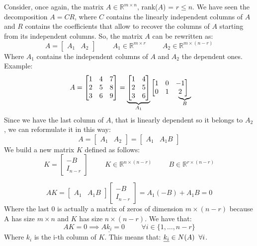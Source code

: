Consider, once again, the matrix $A \in \mathbb{R}^{m\times n}$, rank($A$) = $r \leq n$. 
We have seen the decomposition $A = CR$, where $C$ contains the linearly independent columns of $A$ and $R$ contains the coefficients that allow to recover the columns of $A$ starting from its independent columns. 
So, the matrix $A$ can be rewritten as:
\[
  A = \begin{bmatrix}
    A_1 & A_2
  \end{bmatrix} 
  \hspace{1cm}
  A_1 \in \mathbb{R}^{m\times r} \hspace{1cm} A_2 \in \mathbb{R}^{m\times (n-r)} 
\]
Where $A_1$ contains the independent columns of $A$ and $A_2$ the dependent ones.
Example:
\[
A = 
\begin{bmatrix}
    1 & 4 & 7\\
    2 & 5 & 8\\
    3 & 6 & 9
\end{bmatrix}
= 
\underbrace{
\begin{bmatrix}
1 & 4\\
2 & 5\\
3 & 6
\end{bmatrix}}_{A_1}
\begin{bmatrix}
    1 & 0 & -1\\
    0 & 1 & \undermat{B}{2}
\end{bmatrix}
\]
Since we have the last column of $A$, that is linearly dependent so it belongs to $A_2$, we can reformulate it in this way:
\[
    A = \begin{bmatrix}
        A_1 & A_2
      \end{bmatrix} 
    = \begin{bmatrix}
        A_1 & A_1B
    \end{bmatrix}
\]
We build a new matrix $K$ defined as follows:
\[
    K = \begin{bmatrix}
        -B\\
        I_{n-r}
    \end{bmatrix}
    \hspace{1cm}
    K \in \mathbb{R}^{n\times(n-r)}    
    \hspace{1cm}
    B \in \mathbb{R}^{r\times(n-r)}    
\]

\[
AK = \begin{bmatrix}
    A_1 & A_1B
\end{bmatrix} 
\begin{bmatrix}
    -B\\
    I_{n-r}
\end{bmatrix}
= A_1(-B) + A_1B = 0   
\]
Where the last 0 is actually a matrix of zeros of dimension $m\times(n-r)$
because A has size $m\times n$ and $K$ has size $n\times(n-r)$.
We have that:
\[
    AK = 0 \implies A\underline{k_i} = 0 \hspace{1cm} \forall i \in \{1, \dots, n-r\}    
\]
Where $k_i$ is the i-th column of $K$. This means that: $\underline{k_i} \in N(A) \hspace{0.2cm} \forall i$.

